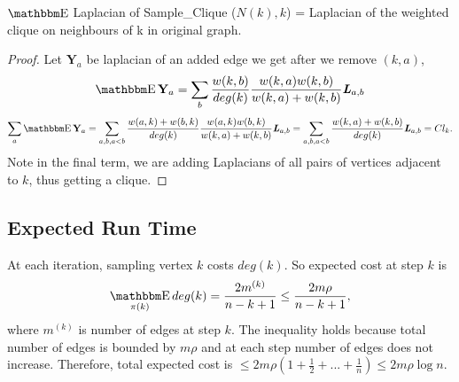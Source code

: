 \documentclass[11pt]{article}
\begin{document}
\begin{proposition}
 $\av$ Laplacian of Sample\_Clique ($N(k), k$) = Laplacian of the weighted clique on  neighbours of k in original graph.
 \end{proposition}
 \begin{proof}
 Let $\mathbf{Y}_a$ be laplacian of an added edge  we get after we remove $(k,a)$,
 \[\av \mathbf{Y}_a =  \sum_b  \frac {w(k,b)}{deg(k)} \frac {w(k,a)w(k,b)}{w(k,a) + w(k,b)} \LL_{a,b}\] 
 \[ \sum_a \av \mathbf{Y}_a = \sum_{a,b, a<b} \frac {w(a,k) + w(b,k)}{deg(k)}  \frac {w(a,k) w(b,k)}{w(k,a) + w(k,b)} \LL_{a,b} = \sum_{a,b, a<b} \frac {w(k,a) + w(k,b)}{deg(k)} \LL_{a,b} = Cl_k.\]
 Note in the final term, we are adding Laplacians of all pairs of vertices adjacent to $k$, thus getting a clique.  
 \end{proof}
 
 \subsection{Expected Run Time}
 At each iteration, sampling vertex $k$ costs $deg(k)$. So expected cost at step $k$ is
 \[\av_{\pi (k)} deg(k) = \frac {2m^{(k)}}{n-k+1} \le \frac {2m\rho}{n-k+1},\]
 where $m^{(k)}$ is number of edges at step $k$. The inequality holds because total number of edges is bounded by $m\rho$ and at each step number of edges does not increase.
Therefore, total expected cost is $\le 2m \rho (1 + \frac  {1}{2} + ... + \frac {1}{n})  \le 2m\rho \log n$.
 


\end{document}
